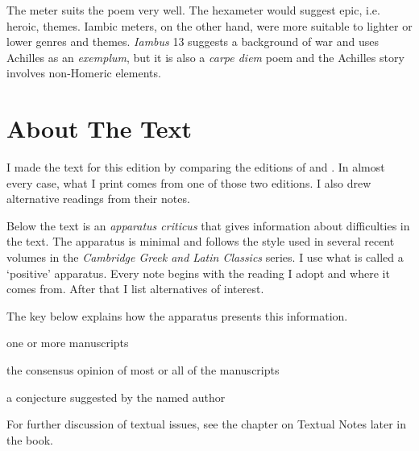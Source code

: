 \indent\metra{\m\mbb\m\mbb\m\c\mbb\m\mbb\m\mbb\m\mb}

\indent\indent\metra{\mb\m\b\m\mb\m\b\mb\cc\m\bb\m\bb\mb}\newline

The meter suits the poem very well.  The hexameter would suggest epic, i.e.  heroic, themes.  Iambic meters, on the other hand, were more suitable to lighter or lower genres and themes.  \textit{Iambus} 13 suggests a background of war and uses Achilles as an \textit{exemplum}, but it is also a \textit{carpe diem} poem and the Achilles story involves non-Homeric elements.


\section*{About The Text}

I made the text for this edition by comparing the editions of \citet{sb1985} and \citet{mankin1995}. In almost every case, what I print comes from one of those two editions. I also drew alternative readings from their notes.

Below the text is an \textit{apparatus criticus} that gives information about difficulties in the text.  The apparatus is minimal and follows the style used in several recent volumes in the \textit{Cambridge Greek and Latin Classics} series.  I use what is called a `positive' apparatus.  Every note begins with the reading I adopt and where it comes from.  After that I list alternatives of interest.  

The key below explains how the apparatus presents this information.

\begin{description}%
    [style=sameline,leftmargin=70pt,labelwidth=\widthof{\textbf{Name}}]
    \item[m] one or more manuscripts
    \item[M] the consensus opinion of most or all of the manuscripts
    \item[Name] a conjecture suggested by the named author
\end{description}

For further discussion of textual issues, see the chapter on Textual Notes later in the book.

